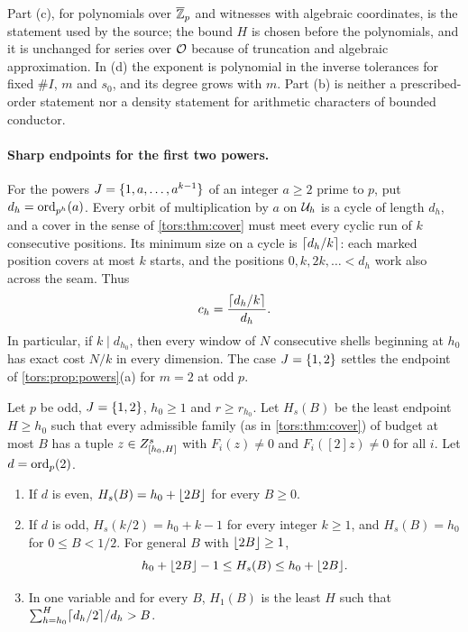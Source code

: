 Part \textup{(c)}, for polynomials over $\overline{\mathbb{Z}}_p$ and witnesses with algebraic
coordinates, is the statement  used by the
source; the bound $H$ is chosen before the polynomials, and it is unchanged for series
over $\mathcal{O}$ because of truncation and algebraic approximation. In \textup{(d)} the exponent is polynomial in the inverse
tolerances for fixed $\#I$, $m$ and $s_0$, and its degree grows with $m$. Part
\textup{(b)} is neither a prescribed-order statement nor a density statement for
arithmetic characters of bounded conductor.

\paragraph{Sharp endpoints for the first two powers.}
For the powers $J=\{1,a,\dots,a^{k-1}\}$ of an integer $a\ge2$ prime to $p$, put
$d_h=\operatorname{ord}_{p^h}(a)$. Every orbit of multiplication by $a$ on $\mathcal{U}_h$ is a cycle of length
$d_h$, and a cover in the sense of \cref{tors:thm:cover} must meet every cyclic run of $k$
consecutive positions. Its minimum size on a cycle is $\lceil d_h/k\rceil$: each marked position
covers at most $k$ starts, and the positions $0,k,2k,\dots<d_h$ work also across the seam.
Thus
\begin{equation}\label{tors:eq:geomcover}
  c_h=\frac{\lceil d_h/k\rceil}{d_h}.
\end{equation}
In particular, if $k\mid d_{h_0}$, then every window of $N$ consecutive shells beginning at
$h_0$ has exact cost $N/k$ in every dimension. The case $J=\{1,2\}$ settles the endpoint
of \cref{tors:prop:powers}(a) for $m=2$ at odd $p$.

\begin{theorem}\label{tors:thm:twopowers}
Let $p$ be odd, $J=\{1,2\}$, $h_0\ge1$ and $r\ge r_{h_0}$. Let $H_s(B)$ be the least
endpoint $H\ge h_0$ such that every admissible family \textup{(}as in
\cref{tors:thm:cover}\textup{)} of budget at most $B$ has a tuple
$z\in Z_{[h_0,H]}^s$ with $F_i(z)\ne0$ and $F_i([2]z)\ne0$ for all $i$. Let
$d=\operatorname{ord}_p(2)$.
\begin{enumerate}[label=\textup{(\alph*)}]
\item If $d$ is even, $H_s(B)=h_0+\lfloor2B\rfloor$ for every $B\ge0$.
\item If $d$ is odd, $H_s(k/2)=h_0+k-1$ for every integer $k\ge1$, and $H_s(B)=h_0$ for
  $0\le B<1/2$. For general $B$ with $\lfloor2B\rfloor\ge1$,
  \[
    h_0+\lfloor2B\rfloor-1\le H_s(B)\le h_0+\lfloor2B\rfloor.
  \]
\item In one variable and for every $B$, $H_1(B)$ is the least $H$ such that
  $\sum_{h=h_0}^H\lceil d_h/2\rceil/d_h>B$.
\end{enumerate}
\end{theorem}

